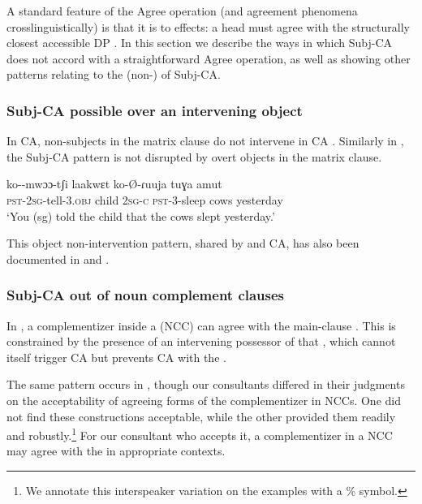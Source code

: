 \documentclass[output=paper,newtxmath,modfonts,nonflat,hidelinks]{langsci/langscibook}
\begin{document}
A standard feature of the Agree operation (and agreement phenomena crosslinguistically) is that it is  to  effects: a head must agree with the structurally closest accessible DP \parencite{Chomsky:2000,Chomsky:2001}. In this section we describe the ways in which  Subj-CA does not accord with a straightforward Agree operation, as well as showing other patterns relating to the (non-)  of Subj-CA. 

\subsubsection{Subj-CA possible over an intervening object}

In  CA, non-subjects in the matrix clause do not intervene in CA \citep{Diercks:2013}. Similarly in , the Subj-CA pattern is not disrupted by overt objects in the matrix clause. 

\ea
\gll ko--mwɔɔ-tʃi laakwɛt  ko-\O-ɾuuja tuɣa amut \\
\textsc{pst}-2\textsc{sg}-tell-3.\textsc{obj} child 2\textsc{sg-c} \textsc{pst}-3-sleep cows yesterday \\
\glt `You (sg) told the child that the cows slept yesterday.'
\z

\noindent This object non-intervention pattern, shared by  and  CA, has also been documented in  \citep{Torrence:2016} and  \citep{LetsholoSafir:2017}.

\subsubsection{Subj-CA out of noun complement clauses} \label{NCCSection}

\noindent In , a complementizer inside a  (NCC) can agree with the main-clause . This is constrained by the presence of an intervening possessor of that , which cannot itself trigger CA but prevents CA with the   \citep[378]{Diercks:2013}. 

The same pattern occurs in , though our consultants differed in their judgments on the acceptability of agreeing forms of the complementizer in NCCs. One did not find these constructions acceptable, while the other provided them readily and robustly.\footnote{We annotate this interspeaker variation on the examples with a \% symbol.} For our consultant who accepts it, a complementizer in a NCC may agree with the   in appropriate contexts. 
\end{document}
